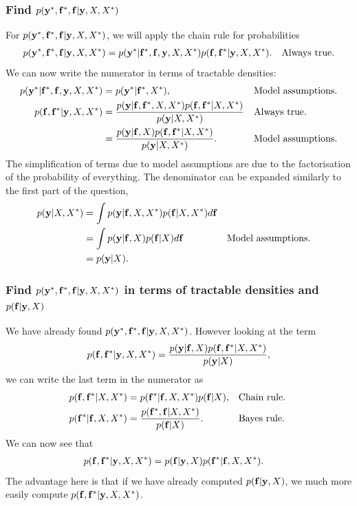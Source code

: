 \documentclass[a4paper]{article}
\theoremstyle{definition}
\begin{document}
\subsubsection{Find $p(\mathbf{y}^*, \mathbf{f}^*, \mathbf{f}|\mathbf{y}, X, X^*)$}
For $p(\mathbf{y}^*, \mathbf{f}^*, \mathbf{f}|\mathbf{y}, X, X^*)$, we will apply the chain rule for probabilities
\begin{align}
  p(\mathbf{y}^*, \mathbf{f}^*, \mathbf{f}|\mathbf{y}, X, X^*) = p(\mathbf{y}^*| \mathbf{f}^*, \mathbf{f}, \mathbf{y}, X ,X^*) p(\mathbf{f}, \mathbf{f}^*| \mathbf{y}, X, X^*). && \text{Always true.}
\end{align}
We can now write the numerator in terms of tractable densities:
\begin{align}
p(\mathbf{y}^*| \mathbf{f}^*, \mathbf{f}, \mathbf{y}, X ,X^*) &= p(\mathbf{y}^* | \mathbf{f}^*, X^*), && \text{Model assumptions}. \\
p(\mathbf{f}, \mathbf{f}^*| \mathbf{y}, X, X^*) &= \frac{p(\mathbf{y}| \mathbf{f},  \mathbf{f}^*, X, X^* )p(\mathbf{f}, \mathbf{f}^*| X, X^*)}{p(\mathbf{y}| X , X^*)} && \text{Always true.} \\
&= \frac{p(\mathbf{y}| \mathbf{f}, X )p(\mathbf{f}, \mathbf{f}^*| X, X^*)}{p(\mathbf{y}| X , X^*)}. && \text{Model assumptions.}
\end{align}
The simplification of terms due to model assumptions are due to the factorisation of the probability of everything. 
The denominator can be expanded similarly to the first part of the question,
\begin{align}
p(\mathbf{y}| X, X^*) &= \int p(\mathbf{y}| \mathbf{f}, X, X^*) p(\mathbf{f}| X, X^*) d \mathbf{f} \\
&= \int p(\mathbf{y}| \mathbf{f}, X) p(\mathbf{f}| X) d \mathbf{f}  && \text{Model assumptions.}\\
&= p(\mathbf{y}|X).
\end{align}

\subsubsection{Find $p(\mathbf{y}^*, \mathbf{f}^*, \mathbf{f}|\mathbf{y}, X, X^*)$ in terms of tractable densities and $p(\mathbf{f}|\mathbf{y}, X)$}
We have already found $p(\mathbf{y}^*, \mathbf{f}^*, \mathbf{f}|\mathbf{y}, X, X^*)$.
However looking at the term 
\begin{align}
p(\mathbf{f}, \mathbf{f}^*| \mathbf{y}, X, X^*) = \frac{p(\mathbf{y}| \mathbf{f}, X )p(\mathbf{f}, \mathbf{f}^*| X, X^*)}{p(\mathbf{y}| X)}, 
\end{align}
we can write the last term in the numerator as 
\begin{align}
p(\mathbf{f}, \mathbf{f}^*| X, X^*) &= p(\mathbf{f}^* | \mathbf{f}, X, X^*) p(\mathbf{f}| X), && \text{Chain rule.} \\
p(\mathbf{f}^* | \mathbf{f}, X, X^*) &= \frac{p(\mathbf{f}^*, \mathbf{f}| X, X^*)}{ p(\mathbf{f}| X)}. && \text{Bayes rule.} \
\end{align}
We can now see that 
\begin{align}
p(\mathbf{f}, \mathbf{f}^*| \mathbf{y}, X, X^*) &= p(\mathbf{f}| \mathbf{y}, X )p(\mathbf{f}^* | \mathbf{f}, X, X^*).
\end{align}
The advantage here is that if we have already computed $p(\mathbf{f}| \mathbf{y}, X )$, we much more easily compute $p(\mathbf{f}, \mathbf{f}^*| \mathbf{y}, X, X^*)$.
\end{document}
